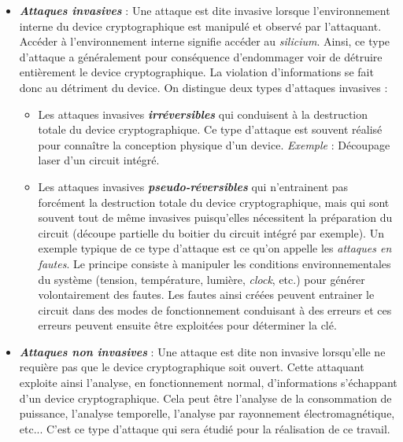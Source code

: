 \documentclass[oneside]{book}
\begin{document}
\begin{itemize}
\item \textbf{\textit{Attaques invasives}} : Une attaque est dite invasive lorsque l'environnement interne du device cryptographique est manipulé et observé par l'attaquant. Accéder à l'environnement interne signifie accéder au \textit{silicium}. Ainsi, ce type d'attaque a généralement pour conséquence d'endommager voir de détruire entièrement le device cryptographique. La violation d'informations se fait donc au détriment du device. On distingue deux types d'attaques invasives : 
\begin{itemize}
\item Les attaques invasives \textbf{\textit{irréversibles}} qui conduisent à la destruction totale du device cryptographique. Ce type d'attaque est souvent réalisé pour connaître la conception physique d'un device. \textit{Exemple} : Découpage laser d’un circuit intégré.
\item Les attaques invasives \textbf{\textit{pseudo-réversibles}} qui n’entrainent pas forcément la destruction totale du device cryptographique, mais qui sont souvent tout de même invasives puisqu’elles nécessitent la préparation du circuit (découpe partielle du boitier du circuit intégré par exemple). Un exemple typique de ce type d'attaque est ce qu'on appelle les \textit{attaques en fautes}. Le principe consiste à manipuler les conditions environnementales du système (tension, température, lumière, \textit{clock}, etc.) pour générer volontairement des fautes. Les fautes ainsi créées peuvent entrainer le circuit dans des modes de fonctionnement conduisant à des erreurs et ces erreurs peuvent ensuite être exploitées pour déterminer la clé.
\end{itemize}
\item \textbf{\textit{Attaques non invasives}} : Une attaque est dite non invasive lorsqu'elle ne requière pas que le device cryptographique soit ouvert. Cette attaquant exploite ainsi l'analyse, en fonctionnement normal, d'informations s'échappant d'un device cryptographique. Cela peut être l'analyse de la consommation de puissance, l'analyse temporelle, l'analyse par rayonnement électromagnétique, etc... C'est ce type d'attaque qui sera étudié pour la réalisation de ce travail. \\
\end{itemize}
\end{document}
